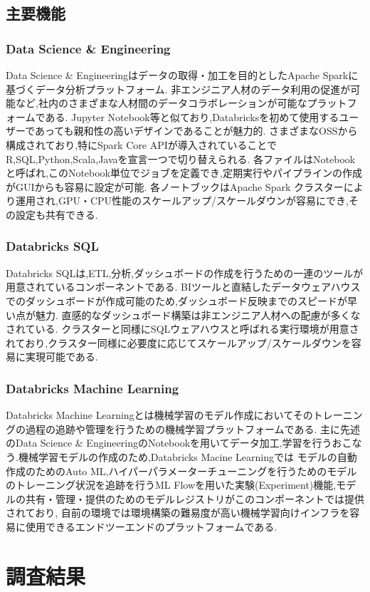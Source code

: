 \documentclass[twocolumn]{jsarticle}
\begin{document}
\subsection{主要機能}
\subsubsection{Data Science \& Engineering}
Data Science \& Engineeringはデータの取得・加工を目的としたApache Sparkに基づくデータ分析プラットフォーム.
非エンジニア人材のデータ利用の促進が可能など,社内のさまざまな人材間のデータコラボレーションが可能なプラットフォームである.
Jupyter Notebook等と似ており,Databricksを初めて使用するユーザーであっても親和性の高いデザインであることが魅力的.
さまざまなOSSから構成されており,特にSpark Core APIが導入されていることでR,SQL,Python,Scala,Javaを宣言一つで切り替えられる.
各ファイルはNotebookと呼ばれ,このNotebook単位でジョブを定義でき,定期実行やパイプラインの作成がGUIからも容易に設定が可能.
各ノートブックはApache Spark クラスターにより運用され,GPU・CPU性能のスケールアップ/スケールダウンが容易にでき,その設定も共有できる.
\subsubsection{Databricks SQL}
Databricks SQLは,ETL,分析,ダッシュボードの作成を行うための一連のツールが用意されているコンポーネントである.
BIツールと直結したデータウェアハウスでのダッシュボードが作成可能のため,ダッシュボード反映までのスピードが早い点が魅力.
直感的なダッシュボード構築は非エンジニア人材への配慮が多くなされている.
クラスターと同様にSQLウェアハウスと呼ばれる実行環境が用意されており,クラスター同様に必要度に応じてスケールアップ/スケールダウンを容易に実現可能である.
\subsubsection{Databricks Machine Learning}
Databricks Machine Learningとは機械学習のモデル作成においてそのトレーニングの過程の追跡や管理を行うための機械学習プラットフォームである.
主に先述のData Science \& EngineeringのNotebookを用いてデータ加工,学習を行うおこなう.機械学習モデルの作成のため,Databricks Macine Learningでは
モデルの自動作成のためのAuto ML,ハイパーパラメーターチューニングを行うためのモデルのトレーニング状況を追跡を行うML Flowを用いた実験(Experiment)機能,モデルの共有・管理・提供のためのモデルレジストリがこのコンポーネントでは提供されており,
自前の環境では環境構築の難易度が高い機械学習向けインフラを容易に使用できるエンドツーエンドのプラットフォームである.
\section{調査結果}
\end{document}
